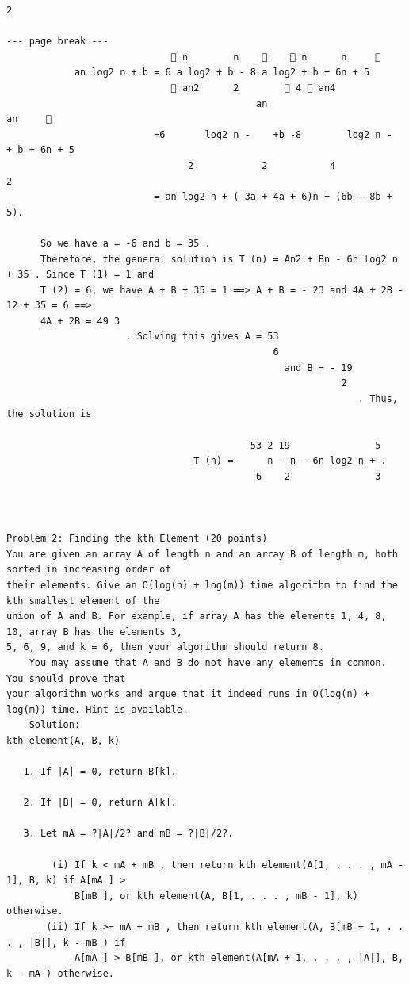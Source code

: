 \documentclass[12pt]{article}
\begin{document}
\begin{Verbatim}[breaklines=true,fontsize=\small]
                                                 2

--- page break ---
                              n        n         n      n     
            an log2 n + b = 6 a log2 + b - 8 a log2 + b + 6n + 5
                              an2      2         4  an4
                                            an                       an     
                          =6       log2 n -    +b -8        log2 n -     + b + 6n + 5
                                2            2           4            2
                          = an log2 n + (-3a + 4a + 6)n + (6b - 8b + 5).

      So we have a = -6 and b = 35 .
      Therefore, the general solution is T (n) = An2 + Bn - 6n log2 n + 35 . Since T (1) = 1 and
      T (2) = 6, we have A + B + 35 = 1 ==> A + B = - 23 and 4A + 2B - 12 + 35 = 6 ==>
      4A + 2B = 49 3
                     . Solving this gives A = 53
                                               6
                                                 and B = - 19
                                                           2
                                                              . Thus, the solution is

                                           53 2 19               5
                                 T (n) =      n - n - 6n log2 n + .
                                            6    2               3



Problem 2: Finding the kth Element (20 points)
You are given an array A of length n and an array B of length m, both sorted in increasing order of
their elements. Give an O(log(n) + log(m)) time algorithm to find the kth smallest element of the
union of A and B. For example, if array A has the elements 1, 4, 8, 10, array B has the elements 3,
5, 6, 9, and k = 6, then your algorithm should return 8.
    You may assume that A and B do not have any elements in common. You should prove that
your algorithm works and argue that it indeed runs in O(log(n) + log(m)) time. Hint is available.
    Solution:
kth element(A, B, k)

   1. If |A| = 0, return B[k].

   2. If |B| = 0, return A[k].

   3. Let mA = ?|A|/2? and mB = ?|B|/2?.

        (i) If k < mA + mB , then return kth element(A[1, . . . , mA - 1], B, k) if A[mA ] >
            B[mB ], or kth element(A, B[1, . . . , mB - 1], k) otherwise.
       (ii) If k >= mA + mB , then return kth element(A, B[mB + 1, . . . , |B|], k - mB ) if
            A[mA ] > B[mB ], or kth element(A[mA + 1, . . . , |A|], B, k - mA ) otherwise.


\end{Verbatim}
\end{document}

